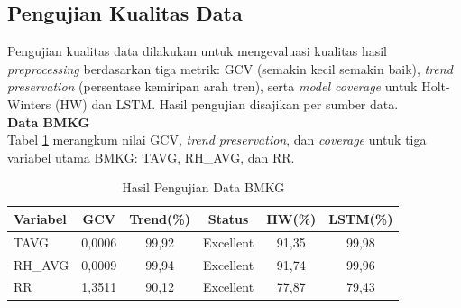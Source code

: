     \subsection{Pengujian Kualitas Data}
    Pengujian kualitas data dilakukan untuk mengevaluasi kualitas hasil \textit{preprocessing} berdasarkan tiga metrik: GCV (semakin kecil semakin baik), \textit{trend preservation} (persentase kemiripan arah tren), serta \textit{model coverage} untuk Holt-Winters (HW) dan LSTM. Hasil pengujian disajikan per sumber data. \\
    \noindent\textbf{Data BMKG} \\
    Tabel \ref{tab:bmkg_datatest} merangkum nilai GCV, \textit{trend preservation}, dan \textit{coverage} untuk tiga variabel utama BMKG: TAVG, RH\_AVG, dan RR.
    \begin{table}[H]
        \centering
        \caption{Hasil Pengujian Data BMKG}
        \label{tab:bmkg_datatest}
        \small
        \renewcommand{\arraystretch}{1.2}
        \setlength{\tabcolsep}{6pt}
        \begin{tabular}{|l|c|c|c|c|c|}
        \hline
        \textbf{Variabel} & \textbf{GCV} & \textbf{Trend(\%)} & \textbf{Status} & \textbf{HW(\%)} & \textbf{LSTM(\%)} \\
        \hline
        TAVG & 0,0006 & 99,92 & Excellent & 91,35 & 99,98 \\
        \hline
        RH\_AVG & 0,0009 & 99,94 & Excellent & 91,74 & 99,96 \\
        \hline
        RR & 1,3511 & 90,12 & Excellent & 77,87 & 79,43 \\
        \hline
        \end{tabular}
    \end{table}
